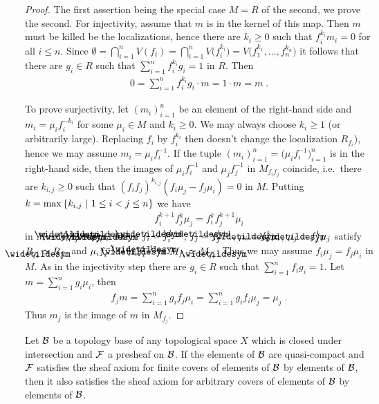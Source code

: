 \documentclass[a4paper,parskip=half,numbers=enddot, DIV=12]{scrreprt}
\begin{document}
\begin{proof}
    The first assertion being the special case $M=R$ of the second, we prove the second. For injectivity, assume that $m$ is in the kernel of this map. Then $m$ must be killed be the localizations, hence there are $k_i\geq0$ such that $f^{k_i}_i m_i = 0$ for all $i\leq n$. Since $\emptyset = \bigcap_{i=1}^n V(f_i) = \bigcap_{i=1}^n V\big(f^{k_i}_i\big) = V\big(f_1^{k_1},\ldots, f_n^{k_n}\big)$ it follows that there are $g_i\in R$ such that $\sum_{i=1}^n f_i^{k_i}g_i = 1$ in $R$. Then 
    \begin{align*}
    	0=\sum_{i=1}^{n}f_i^{k_i}g_i\cdot m=1\cdot m=m\;.
    \end{align*}
    
	    To prove surjectivity, let $(m_i)_{i=1}^n$ be an element of the right-hand side and $m_i=\mu_if_i^{-k_i}$ for some $\mu_i\in M$ and $k_i\geq0$. We may always choose $k_i\geq1$ (or arbitrarily large). Replacing $f_i$ by $f_i^{k_i}$ then doesn't change the localization $R_{f_i}$), hence we may assume $m_i = \mu_if_i^{-1}$. If the tuple $(m_i)_{i=1}^n=\big(\mu_if_i^{-1}\big)_{i=1}^n$ is in the right-hand side, then the images of $\mu_if_i^{-1}$ and $\mu_jf_j^{-1}$ in $M_{f_if_j}$ coincide, i.e.\ there are $k_{i,j}\geq 0$ such that $(f_if_j)^{k_{i,j}}(f_i\mu_j - f_j\mu_i) = 0$ in $M$. Putting $k= \max\left\{ k_{i,j}\ \middle|\  1\leq i <j\leq n\right\}$ we have 
    \begin{align*}
        f_i^{k+1}f_j^k\mu_j = f_i^k f_j^{k+1}\mu_i
    \end{align*}
    in $M$ or $\snake f_i\snake \mu_j = \snake f_j \snake \mu_i$ where $\snake f_i = f_i^{k+1}$, $\snake f_j = f_j^{k+1}$, $\snake \mu_i = f_i^k\mu_i$, $\snake \mu_j = f_j^k\mu_j$ satisfy $R_{\snake f_i} \simeq R_{f_i}$ and $\mu_if_i^{-1} = \smash{\snake \mu_i\snake f_i^{-1}}$ in $M_{f_i} \simeq M_{\snake f_i}$. Thus we may assume $f_i\mu_j = f_j\mu_i$ in $M$. As in the injectivity step there are $g_i\in R$ such that $\sum_{i=1}^n f_i g_i = 1$. Let $m = \sum_{i=1}^n g_i\mu_i$, then 
    \begin{align*}
    	f_jm = \sum_{i=1}^n g_if_j\mu_i = \sum_{i=1}^n g_i f_i\mu_j = \mu_j\;. 
    \end{align*}
    Thus $m_j$ is the image of $m$ in $M_{f_j}$.
\end{proof}
\begin{lem}
    Let $\mathcal{B}$ be a topology base of any topological space $X$ which is closed under intersection and $\mathcal{F}$ a presheaf on $\mathcal{B}$. If the elements of $\mathcal{B}$ are quasi-compact and $\mathcal{F}$ satisfies the sheaf axiom for finite covers of elements of $\mathcal{B}$ by elements of $\mathcal{B}$, then it also satisfies the sheaf axiom for arbitrary covers of elements of $\mathcal{B}$ by elements of $\mathcal{B}$.
\end{lem}
\end{document}
